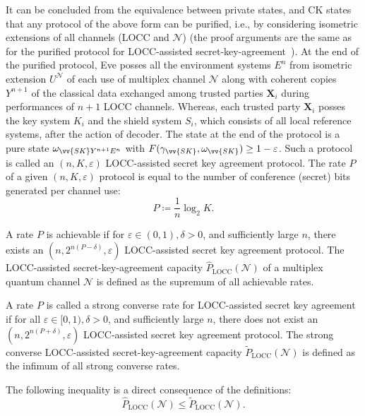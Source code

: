 \documentclass[aps,pra,twocolumn,superscriptaddress,longbibliography]{revtex4-1}
\def\LOCC{\operatorname{LOCC}}
\newcommand{\mc}[1]{\mathcal{#1}}
\newcommand{\tf}[1]{\textbf{#1}}
\begin{document}
It can be concluded from the equivalence between private states, and CK states that any protocol of the above form can be purified, i.e., by considering isometric extensions of all channels (LOCC and $\mc{N}$) (the proof arguments are the same as for the purified protocol for LOCC-assisted secret-key-agreement~\cite{DBW17}). At the end of the purified protocol, Eve posses all the environment systems $E^n$ from isometric extension $U^\mc{N}$ of each use of multiplex channel $\mc{N}$ along with coherent copies $Y^{n+1}$ of the classical data exchanged among trusted parties $\tf{X}_i$ during performances of $n+1$ LOCC channels. Whereas, each trusted party $\tf{X}_i$ posses the key system $K_i$ and the shield system $S_i$, which consists of all local reference systems, after the action of decoder. The state at the end of the protocol is a pure state $\omega_{\vv{SK}Y^{n+1}E^n}$ with $F(\gamma_{\vv{SK}},\omega_{\vv{SK}})\geq 1-\varepsilon$. Such a protocol is called an $(n,K,\varepsilon)$ LOCC-assisted secret key agreement protocol. The rate $P$ of a given $(n,K,\varepsilon)$ protocol is equal to the number of conference (secret) bits generated per channel use:
\begin{equation}
P\coloneqq \frac{1}{n}\log_2K. 
\end{equation}

A rate $P$ is achievable if for $\varepsilon\in(0,1),\delta>0$, and sufficiently large $n$, there exists an $(n,2^{n(P-\delta)},\varepsilon)$ LOCC-assisted secret key agreement protocol. The LOCC-assisted secret-key-agreement capacity $\hat{P}_{\LOCC}(\mc{N})$ of a multiplex quantum channel $\mc{N}$ is defined as the supremum of all achievable rates.

A rate $P$ is called a strong converse rate for LOCC-assisted secret key agreement if for all $\varepsilon\in[0,1), \delta>0$, and sufficiently large $n$, there does not exist an $(n, 2^{n(P+\delta)},\varepsilon)$ LOCC-assisted secret key agreement protocol. The strong converse LOCC-assisted secret-key-agreement capacity $\widetilde{P}_{\LOCC}(\mc{N})$ is defined as the infimum of all strong converse rates. 

The following inequality is a direct consequence of the definitions: 
\begin{equation}
\hat{P}_{\LOCC}(\mc{N})\leq \widetilde{P}_{\LOCC}(\mc{N}).
\end{equation}
\end{document}
